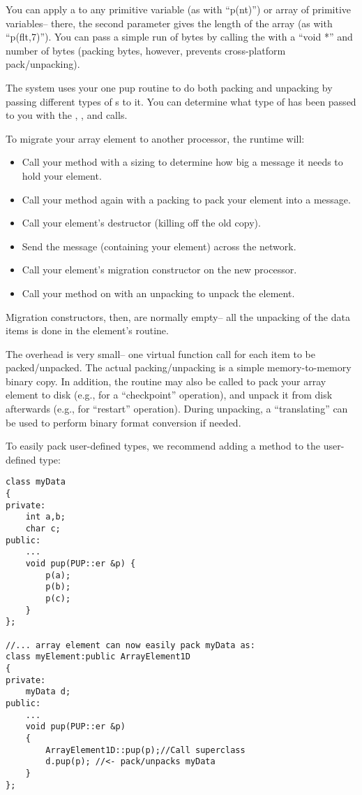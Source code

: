 You can apply a  to any primitive variable
(as with ``p(nt)'') or array of primitive variables-- there,
the second parameter gives the length of the array (as with
``p(flt,7)'').  You can pass a simple run of bytes 
by calling the  with a ``void *'' and number of bytes
(packing bytes, however, prevents cross-platform pack/unpacking).

The system uses your one pup routine to do both packing and
unpacking by passing different types of s to it. 
You can determine what type of  has been passed to you 
with the , , and  calls.

To migrate your array element to another processor, the \charmpp 
runtime will:

\begin{itemize}
\item Call your  method with a sizing  to determine how 
big a message it needs to hold your element.
\item Call your  method again with a packing  to pack 
your element into a message.
\item Call your element's destructor (killing off the old copy).
\item Send the message (containing your element) across the network.
\item Call your element's migration constructor on the new processor.
\item Call your  method on with an unpacking  to unpack 
the element.
\end{itemize}

Migration constructors, then, are normally empty-- all the
unpacking of the data items is done in the element's  routine.

The  overhead is very small-- one 
virtual function call for each item to be packed/unpacked.
The actual packing/unpacking is a simple memory-to-memory 
binary copy.  In addition, the  routine may also be called to 
pack your array 
element to disk (e.g., for a ``checkpoint'' operation), and unpack 
it from disk afterwards (e.g., for ``restart'' operation).  
During unpacking, a ``translating''  can be used to perform binary
format conversion if needed.

To easily pack user-defined types, we recommend adding
a  method to the user-defined type:

\begin{verbatim}
class myData 
{
private:
    int a,b;
    char c;
public:
    ...
    void pup(PUP::er &p) {
        p(a);
        p(b);
        p(c);
    }
};

//... array element can now easily pack myData as:
class myElement:public ArrayElement1D 
{
private:
    myData d;
public:
    ...
    void pup(PUP::er &p)
    {
        ArrayElement1D::pup(p);//Call superclass
        d.pup(p); //<- pack/unpacks myData
    }
};
\end{verbatim}


